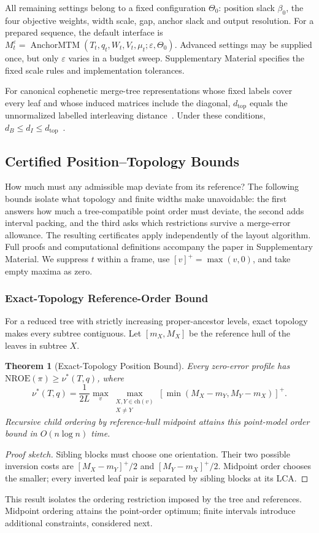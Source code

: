 \documentclass[review]{vgtc}
\newtheorem{theorem}{Theorem}
\newcommand{\dtop}{d_{\mathrm{top}}}
\newcommand{\nroe}{\mathrm{NROE}}
\begin{document}
All remaining settings belong to a fixed configuration $\Theta_0$: position slack $\beta_0$, the four objective weights, width scale, gap, anchor slack and output resolution. For a prepared sequence, the default interface is $M_t^\varepsilon=\operatorname{AnchorMTM}(T_t,q_t,W_t,V_t,\mu_t;\varepsilon,\Theta_0)$. Advanced settings may be supplied once, but only $\varepsilon$ varies in a budget sweep. Supplementary Material specifies the fixed scale rules and implementation tolerances.

For canonical cophenetic merge-tree representations whose fixed labels cover every leaf and whose induced matrices include the diagonal, $\dtop$ equals the unnormalized labelled interleaving distance~\cite{Munch:2019:LINF,Gasparovic:2024:IID}. Under these conditions, $d_B\le d_I\le\dtop$~\cite{Morozov:2013:IDMT}. 


\subsection{Certified Position--Topology Bounds}\label{sec:bounds}
How much must any admissible map deviate from its reference? The following bounds isolate what topology and finite widths make unavoidable: the first answers how much a tree-compatible point order must deviate, the second adds interval packing, and the third asks which restrictions survive a merge-error allowance. The resulting certificates apply independently of the layout algorithm. Full proofs and computational definitions accompany the paper in Supplementary Material. We suppress $t$ within a frame, use $[v]^+=\max(v,0)$, and take empty maxima as zero.

\subsubsection{Exact-Topology Reference-Order Bound}
For a reduced tree with strictly increasing proper-ancestor levels, exact topology makes every subtree contiguous. Let $[m_X,M_X]$ be the reference hull of the leaves in subtree $X$.
\begin{theorem}[Exact-Topology Position Bound]\label{thm:order}
Every zero-error profile has $\nroe(\pi)\ge\nu^*(T,q)$, where
\begin{equation}\label{eq:nu}
 \nu^*(T,q)=\frac{1}{2L}\max_v\max_{\substack{X,Y\in\mathrm{ch}(v)\\X\ne Y}}
 [\min(M_X-m_Y,M_Y-m_X)]^+.
\end{equation}
Recursive child ordering by reference-hull midpoint attains this point-model order bound in $O(n\log n)$ time.
\end{theorem}
\begin{proof}[Proof sketch]
Sibling blocks must choose one orientation. Their two possible inversion costs are $[M_X-m_Y]^+/2$ and $[M_Y-m_X]^+/2$. Midpoint order chooses the smaller; every inverted leaf pair is separated by sibling blocks at its LCA.
\end{proof}
This result isolates the ordering restriction imposed by the tree and references. Midpoint ordering attains the point-order optimum; finite intervals introduce additional constraints, considered next.
\end{document}
